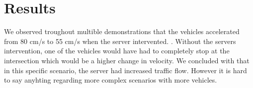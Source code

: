 \section{Results}

We observed troughout multible demonstrations that the vehicles accelerated from 80 cm/s to 55 cm/s when the server intervented. . Without the servers intervention, one of the vehicles would have had to completely stop at the intersection which would be a higher change in velocity. We concluded with that in this specific scenario, the server had increased traffic flow. However it is hard to say anyhting regarding more complex scenarios with more vehicles.



